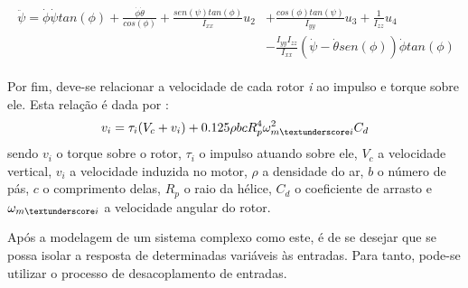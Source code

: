 \begin{align}
\begin{split}
\ddot{\psi} = \dot{\phi}\dot{\psi}tan(\phi) +
\frac{\dot{\phi}\dot{\theta}}{cos(\phi)} + 
\frac{sen(\psi)tan(\phi)}{I_{xx}}u_2 &+ 
\frac{cos(\phi)tan(\psi)}{I_{yy}}u_3 + 
\frac{1}{I_{zz}}u_4 \\
&-\frac{I_{yy}I_{zz}}{I_{xx}} 
(\dot{\psi}-\dot{\theta}sen(\phi))\dot{\phi}tan(\phi)
\end{split}
\end{align}

Por fim, deve-se relacionar a velocidade de cada rotor \textit{i} ao impulso e torque sobre ele. Esta relação é dada por \cite[p.~7]{Balas2007}:
\begin{equation}
v_i = \tau_i(V_c+v_i)+0.125\rho bcR_p^4\omega_{m\textunderscore i}^2C_d
\end{equation}
sendo $v_i$ o torque sobre o rotor, $\tau_i$ o impulso atuando sobre ele, $V_c$ a velocidade vertical, $v_i$ a velocidade induzida no motor, $\rho$ a densidade do ar, $b$ o número de pás, $c$ o comprimento delas, $R_p$ o raio da hélice, $C_d$ o coeficiente de arrasto e $\omega_{m\textunderscore i}$ a velocidade angular do rotor.

Após a modelagem de um sistema complexo como este, é de se desejar que se possa isolar a resposta de determinadas variáveis às entradas. Para tanto, pode-se utilizar o processo de desacoplamento de entradas.
